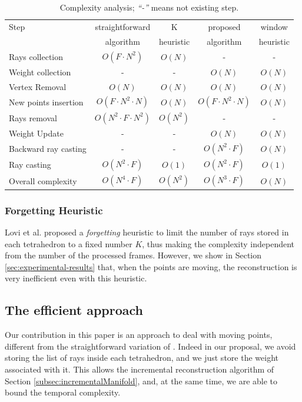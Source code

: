 \begin{table}[t]
\caption{Complexity analysis; \emph{``-''} means not existing step.}
\label{tab:ComStraight}
\scriptsize
\centering
\begin{tabular}{lcccc}
\toprule 
Step                & straightforward     & K  & proposed     & window \\
                    & algorithm & heuristic & algorithm & heuristic \\
\midrule
Rays collection     &  $O(F\cdot N^2)$ & $O(N)$ &-&-\\
Weight collection    &-&- &  $O(N)$ & $O(N)$ \\
Vertex Removal      &  $O(N)$           & $O(N)$ &  $O(N)$           & $O(N)$ \\
New points insertion&  $O(F\cdot N^2 \cdot N)$ & $O(N)$ &  $O(F\cdot N^2 \cdot N)$ & $O(N)$ \\
Rays removal     &  $O(N^2\cdot F\cdot N^2)$ & $O(N^2)$ &-&-\\
Weight Update     &-&-&  $O(N)$ & $O(N)$ \\
Backward ray casting &-&-    &  $O(N^2\cdot F)$ & $O(N)$ \\
Ray casting     &  $O(N^2\cdot F)$ & $O(1)$ &  $O(N^2\cdot F)$ & $O(1)$ \\
\midrule
Overall complexity     &  $O(N^4\cdot F)$ & $O(N^2)$ &  $O(N^3\cdot F)$ & $O(N)$ \\
\end{tabular}
\end{table}

\subsubsection{Forgetting Heuristic}
Lovi et al. \cite{Lovi_et_al_11} proposed a \emph{forgetting} heuristic to limit the number of rays stored in each tetrahedron to a fixed number $K$, thus making the complexity independent from the number of the processed frames. 
However, we show in Section \ref{sec:experimental-results} that, when the points are moving,  the reconstruction is very inefficient even with this heuristic.

\subsection{The efficient approach}
\label{subsec:efficient_way}
Our contribution in this paper is an approach to deal with moving points, different from the straightforward variation of \cite{Lovi_et_al_11}. Indeed in our proposal, we avoid storing the list of rays inside each tetrahedron, and we just store the weight associated with it.
This allows the incremental reconstruction algorithm of Section \ref{subsec:incrementalManifold}, and, at the same time, we are able to bound the temporal complexity.


